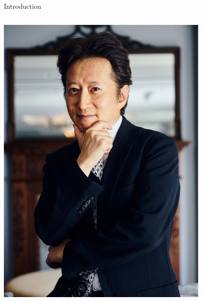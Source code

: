 \documentclass[presentation]{beamer}
\begin{document}
\begin{frame}{Introduction}
\begin{columns}[T]
\begin{column}{0.55\textwidth}
{				\hspace{0.6em}\includegraphics[height=0.34\textheight,width=\linewidth,keepaspectratio]{Hirohiko_Araki.png}
				\vspace{0.4em} 
			}
			
		\end{column}
		
	\end{columns}
\end{frame}
\end{document}
